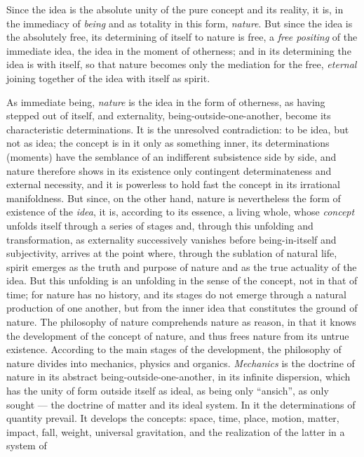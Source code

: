 Since the idea is the absolute unity of the pure concept and its
reality, it is, in the immediacy of \emph{being} and as totality in this
form, \emph{nature}. But since the idea is the absolutely free, its
determining of itself to nature is free, a \emph{free positing} of the
immediate idea, the idea in the moment of otherness; and in its
determining the idea is with itself, so that nature becomes only the
mediation for the free, \emph{eternal} joining together of the idea
with itself as spirit.

As immediate being, \emph{nature} is the idea in the form of otherness,
as having stepped out of itself, and externality, being-outside-one-another,
become its characteristic determinations. It is the unresolved
contradiction: to be idea, but not as idea; the concept is in it only as
something inner, its determinations (moments) have the semblance of an
indifferent subsistence side by side, and nature therefore shows in its
existence only contingent determinateness and external
necessity, and it is powerless to hold fast the concept in its
irrational manifoldness. But since, on the other hand, nature is
nevertheless the form of existence of the \emph{idea}, it is, according
to its essence, a living whole, whose \emph{concept} unfolds itself
through a series of stages and, through this unfolding and
transformation, as externality successively vanishes before
being-in-itself and subjectivity, arrives at the point where, through
the sublation of natural life, spirit emerges as the truth and purpose
of nature and as the true actuality of the idea. But this unfolding is
an unfolding in the sense of the concept, not in that of time; for
nature has no history, and its stages do not emerge through a natural
production of one another, but from the inner idea that constitutes the
ground of nature. The philosophy of nature comprehends nature as reason,
in that it knows the development of the concept of nature, and thus
frees nature from its untrue existence. According to the main stages of
the development, the philosophy of nature divides into mechanics,
physics and organics. \emph{Mechanics} is the doctrine of nature in its
abstract being-outside-one-another, in its infinite dispersion, which
has the unity of form outside itself as ideal, as being only
``ansich'', as only sought --- the doctrine of matter and its ideal
system. In it the determinations of quantity prevail. It develops the
concepts: space, time, place, motion, matter, impact, fall, weight,
universal gravitation, and the realization of the latter in a system of
